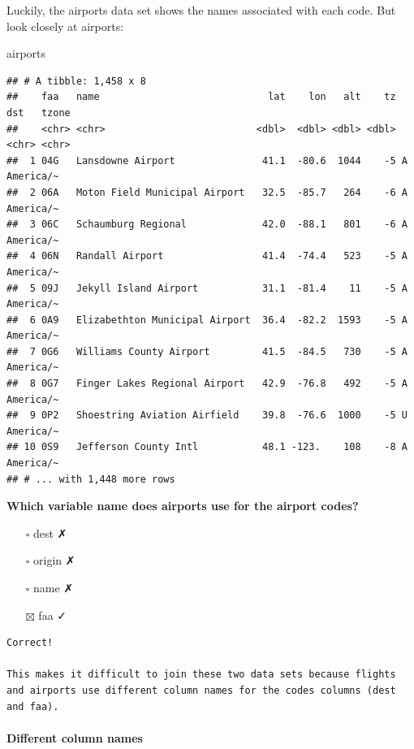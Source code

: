 \documentclass[
]{article}
\newenvironment{Shaded}{\begin{snugshade}}{\end{snugshade}}
\newcommand{\NormalTok}[1]{#1}
\providecommand{\tightlist}{%
  \setlength{\itemsep}{0pt}\setlength{\parskip}{0pt}}
\begin{document}
Luckily, the airports data set shows the names associated with each
code. But look closely at airports:

\begin{Shaded}
\begin{Highlighting}[]
\NormalTok{airports}
\end{Highlighting}
\end{Shaded}

\begin{verbatim}
## # A tibble: 1,458 x 8
##    faa   name                             lat    lon   alt    tz dst   tzone    
##    <chr> <chr>                          <dbl>  <dbl> <dbl> <dbl> <chr> <chr>    
##  1 04G   Lansdowne Airport               41.1  -80.6  1044    -5 A     America/~
##  2 06A   Moton Field Municipal Airport   32.5  -85.7   264    -6 A     America/~
##  3 06C   Schaumburg Regional             42.0  -88.1   801    -6 A     America/~
##  4 06N   Randall Airport                 41.4  -74.4   523    -5 A     America/~
##  5 09J   Jekyll Island Airport           31.1  -81.4    11    -5 A     America/~
##  6 0A9   Elizabethton Municipal Airport  36.4  -82.2  1593    -5 A     America/~
##  7 0G6   Williams County Airport         41.5  -84.5   730    -5 A     America/~
##  8 0G7   Finger Lakes Regional Airport   42.9  -76.8   492    -5 A     America/~
##  9 0P2   Shoestring Aviation Airfield    39.8  -76.6  1000    -5 U     America/~
## 10 0S9   Jefferson County Intl           48.1 -123.    108    -8 A     America/~
## # ... with 1,448 more rows
\end{verbatim}

\textbf{Which variable name does airports use for the airport codes?}

\begin{itemize}
\tightlist
\item[$\square$]
  dest ✗
\item[$\square$]
  origin ✗
\item[$\square$]
  name ✗
\item[$\boxtimes$]
  faa ✓
\end{itemize}

\begin{verbatim}
Correct!

This makes it difficult to join these two data sets because flights and airports use different column names for the codes columns (dest and faa).
\end{verbatim}

\hypertarget{different-column-names}{%
\paragraph{Different column names}\label{different-column-names}}
\end{document}
